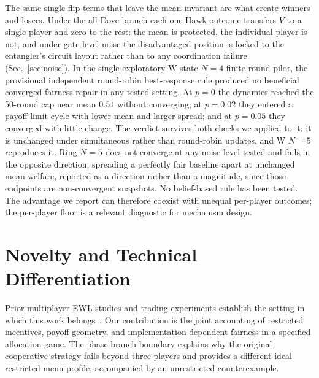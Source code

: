 \documentclass[conference,letterpaper,10pt]{IEEEtran}
\begin{document}
The same single-flip terms that leave the mean invariant are what create
winners and losers. Under the all-Dove branch each one-Hawk outcome transfers
$V$ to a single player and zero to the rest: the mean is protected, the
individual player is not, and under gate-level noise the disadvantaged
position is locked to the entangler's circuit layout rather than to any
coordination failure (Sec.~\ref{sec:noise}).
In the single exploratory W-state $N=4$ finite-round pilot, the provisional
independent round-robin best-response rule produced no beneficial converged
fairness repair in any tested setting. At $p=0$ the dynamics reached the
50-round cap near mean $0.51$ without converging; at $p=0.02$ they entered a
payoff limit cycle with lower mean and larger spread; and at $p=0.05$ they
converged with little change. The verdict survives both checks we applied to it:
it is unchanged under simultaneous rather than round-robin updates, and W
$N=5$ reproduces it. Ring $N=5$ does not converge at any noise level tested
and fails in the opposite direction, spreading a perfectly fair baseline apart
at unchanged mean welfare, reported as a direction rather than a magnitude, since those endpoints are non-convergent snapshots. No belief-based rule has been
tested. The advantage we
report can therefore coexist with unequal per-player outcomes; the per-player
floor is a relevant diagnostic for mechanism design.




\section{Novelty and Technical Differentiation}\label{sec:novelty}
Prior multiplayer EWL studies and trading experiments establish the setting
in which this work belongs~\cite{benjamin2001,chappell2012,khan2025,varsamis2025}.
Our contribution is the joint accounting of restricted incentives, payoff
geometry, and implementation-dependent fairness in a specified allocation
game. The phase-branch boundary explains why the original cooperative
strategy fails beyond three players and provides a different ideal
restricted-menu profile, accompanied by an unrestricted counterexample.
\end{document}
